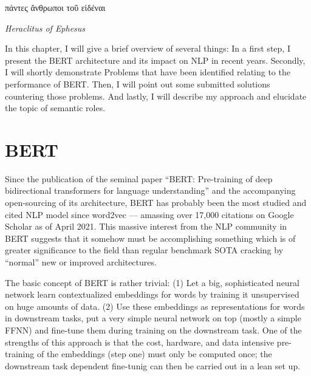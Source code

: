 \label{chap:2_approach}

\epigraph{\textgreek{πάντες ἄνθρωποι τοῦ εἰδέναι}}{\textit{Heraclitus of Ephesus}}


In this chapter, I will give a brief overview of several things: In a first step, I present
the BERT architecture and its impact on NLP in recent years. Secondly, I will shortly demonstrate
Problems that have been identified relating to the performance of BERT. Then, I will point out
some submitted solutions countering those problems. And lastly, I will describe my approach and
elucidate the topic of semantic roles.

\section{BERT}

Since the publication of the seminal paper ``BERT: Pre-training of deep bidirectional transformers
for language understanding'' \cite{devlin2018bert} and the accompanying open-sourcing of its
architecture, BERT has probably been the
most studied and cited NLP model since word2vec \cite{mikolov2013distributed} --- amassing over
17,000 citations on Google Scholar as of April 2021. This massive interest from the NLP community
in BERT suggests that it somehow must be accomplishing something which is of greater significance
to the field than regular benchmark SOTA cracking by ``normal'' new or improved architectures.


The basic concept of BERT is rather trivial: (1) Let a big, sophisticated neural network learn
contextualized embeddings for words by training it unsupervised on huge amounts of data. (2)
Use these embeddings as representations for words in downstream tasks, put a very simple neural
network on top (mostly a simple FFNN) and fine-tune them during training on the downstream task.
One of the strengths of this approach is that the cost, hardware, and data intensive pre-training of the
embeddings (step one) must only be computed once; the downstream task dependent fine-tunig can then
be carried out in a lean set up.

